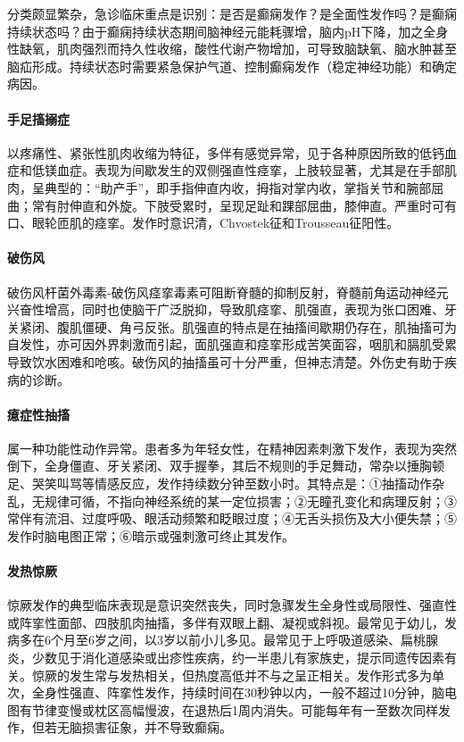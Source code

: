 分类颇显繁杂，急诊临床重点是识别：是否是癫痫发作？是全面性发作吗？是癫痫持续状态吗？由于癫痫持续状态期间脑神经元能耗骤增，脑内pH下降，加之全身性缺氧，肌肉强烈而持久性收缩，酸性代谢产物增加，可导致脑缺氧、脑水肿甚至脑疝形成。持续状态时需要紧急保护气道、控制癫痫发作（稳定神经功能）和确定病因。

\paragraph{手足搐搦症}

以疼痛性、紧张性肌肉收缩为特征，多伴有感觉异常，见于各种原因所致的低钙血症和低镁血症。表现为间歇发生的双侧强直性痉挛，上肢较显著，尤其是在手部肌肉，呈典型的：“助产手”，即手指伸直内收，拇指对掌内收，掌指关节和腕部屈曲；常有肘伸直和外旋。下肢受累时，呈现足趾和踝部屈曲，膝伸直。严重时可有口、眼轮匝肌的痉挛。发作时意识清，Chvostek征和Trousseau征阳性。

\paragraph{破伤风}

破伤风杆菌外毒素-破伤风痉挛毒素可阻断脊髓的抑制反射，脊髓前角运动神经元兴奋性增高，同时也使脑干广泛脱抑，导致肌痉挛、肌强直，表现为张口困难、牙关紧闭、腹肌僵硬、角弓反张。肌强直的特点是在抽搐间歇期仍存在，肌抽搐可为自发性，亦可因外界刺激而引起，面肌强直和痉挛形成苦笑面容，咽肌和膈肌受累导致饮水困难和呛咳。破伤风的抽搐虽可十分严重，但神志清楚。外伤史有助于疾病的诊断。

\paragraph{癔症性抽搐}

属一种功能性动作异常。患者多为年轻女性，在精神因素刺激下发作，表现为突然倒下，全身僵直、牙关紧闭、双手握拳，其后不规则的手足舞动，常杂以捶胸顿足、哭笑叫骂等情感反应，发作持续数分钟至数小时。其特点是：①抽搐动作杂乱，无规律可循，不指向神经系统的某一定位损害；②无瞳孔变化和病理反射；③常伴有流泪、过度呼吸、眼活动频繁和眨眼过度；④无舌头损伤及大小便失禁；⑤发作时脑电图正常；⑥暗示或强刺激可终止其发作。

\paragraph{发热惊厥}

惊厥发作的典型临床表现是意识突然丧失，同时急骤发生全身性或局限性、强直性或阵挛性面部、四肢肌肉抽搐，多伴有双眼上翻、凝视或斜视。最常见于幼儿，发病多在6个月至6岁之间，以3岁以前小儿多见。最常见于上呼吸道感染、扁桃腺炎，少数见于消化道感染或出疹性疾病，约一半患儿有家族史，提示同遗传因素有关。惊厥的发生常与发热相关，但热度高低并不与之呈正相关。发作形式多为单次，全身性强直、阵挛性发作，持续时间在30秒钟以内，一般不超过10分钟，脑电图有节律变慢或枕区高幅慢波，在退热后1周内消失。可能每年有一至数次同样发作，但若无脑损害征象，并不导致癫痫。

